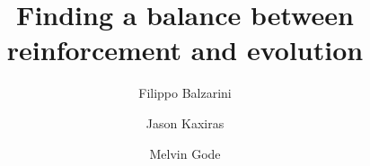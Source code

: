 \begin{frontmatter}
%
\title{%
Finding a balance between\\reinforcement and evolution\\
}
%
\author[UppsalaUniversity]{Filippo Balzarini} 
\author[UppsalaUniversity]{Jason Kaxiras}
\author[UppsalaUniversity]{Melvin Gode}
\address[UppsalaUniversity]{Department of Computer Science, Uppsala University, Uppsala, Sweden}
%
%
\renewcommand*{\today}{\MonthYearDateFormat\displaydate{dateName}} 
%
\begin{abstract}

\end{abstract}
%
\end{frontmatter}
%
%
%

